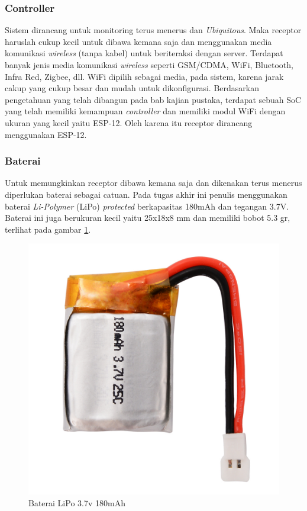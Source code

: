 \subsubsection{Controller}
Sistem dirancang untuk monitoring terus menerus dan \textit{Ubiquitous}. Maka receptor haruslah cukup kecil untuk dibawa kemana saja dan menggunakan media komunikasi \textit{wireless} (tanpa kabel) untuk beriteraksi dengan server. Terdapat banyak jenis media komunikasi \textit{wireless} seperti GSM/CDMA, WiFi, Bluetooth, Infra Red, Zigbee, dll. WiFi dipilih sebagai media, pada sistem, karena jarak cakup yang cukup besar dan mudah untuk dikonfigurasi. Berdasarkan pengetahuan yang telah dibangun pada bab kajian pustaka, terdapat sebuah SoC yang telah memiliki kemampuan \textit{controller} dan memiliki modul WiFi dengan ukuran yang kecil yaitu ESP-12. Oleh karena itu receptor dirancang menggunakan ESP-12.

\subsubsection{Baterai}
Untuk memungkinkan receptor dibawa kemana saja dan dikenakan terus menerus diperlukan baterai sebagai catuan. Pada tugas akhir ini penulis menggunakan baterai \textit{Li-Polymer} (LiPo) \textit{protected} berkapasitas 180mAh dan tegangan 3.7V. Baterai ini juga berukuran kecil yaitu 25x18x8 mm dan memiliki bobot 5.3 gr, terlihat pada gambar \ref{battery}.

\begin{figure}[H]
	\centering
	\includegraphics[scale=0.14]{images/baterai.jpg}
	\caption{Baterai LiPo 3.7v 180mAh}
	\label{battery}
\end{figure}

